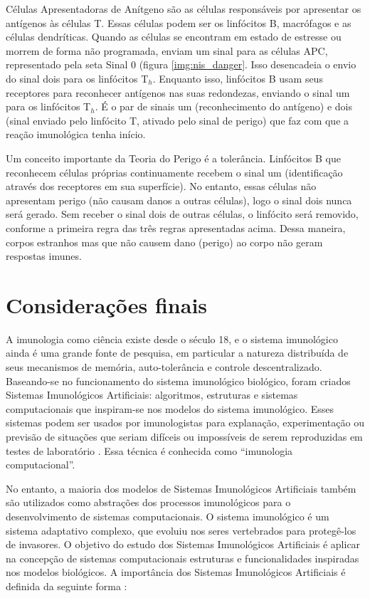 Células Apresentadoras de Anítgeno são as células responsáveis por apresentar os antígenos às células T. Essas células podem ser os linfócitos B, macrófagos e as células dendríticas. Quando as células se encontram em estado de estresse ou morrem de forma não programada, enviam um sinal para as células APC, representado pela seta Sinal 0 (figura \ref{img:nis_danger}. Isso desencadeia o envio do sinal dois para os linfócitos T$_{h}$. Enquanto isso, linfócitos B usam seus receptores para reconhecer antígenos nas suas redondezas, enviando o sinal um para os linfócitos T$_{h}$. É o par de sinais um (reconhecimento do antígeno) e dois (sinal enviado pelo linfócito T, ativado pelo sinal de perigo) que faz com que a reação imunológica tenha início.

Um conceito importante da Teoria do Perigo é a tolerância. Linfócitos B que reconhecem células próprias continuamente recebem o sinal um (identificação através dos receptores em sua superfície). No entanto, essas células não apresentam perigo (não causam danos a outras células), logo o sinal dois nunca será gerado. Sem receber o sinal dois de outras células, o linfócito será removido, conforme a primeira regra das três regras apresentadas acima. Dessa maneira, corpos estranhos mas que não causem dano (perigo) ao corpo não geram respostas imunes.

\section{Considerações finais}

A imunologia como ciência existe desde o século 18, e o sistema imunológico ainda é uma grande fonte de pesquisa, em particular a natureza distribuída de seus mecanismos de memória, auto-tolerância e controle descentralizado. Baseando-se no funcionamento do sistema imunológico biológico, foram criados Sistemas Imunológicos Artificiais: algoritmos, estruturas e sistemas computacionais que inspiram-se nos modelos do sistema imunológico. Esses sistemas podem ser usados por imunologistas para explanação, experimentação ou previsão de situações que seriam difíceis ou impossíveis de serem reproduzidas em testes de laboratório \cite{Garrett2005}. Essa técnica é conhecida como ``imunologia computacional''.

No entanto, a maioria dos modelos de Sistemas Imunológicos Artificiais também são utilizados como abstrações dos processos imunológicos para o desenvolvimento de sistemas computacionais. O sistema imunológico é um sistema adaptativo complexo, que evoluiu nos seres vertebrados para protegê-los de invasores. O objetivo do estudo dos Sistemas Imunológicos Artificiais é aplicar na concepção de sistemas computacionais estruturas e funcionalidades inspiradas nos modelos biológicos. A importância dos Sistemas Imunológicos Artificiais é definida da seguinte forma \cite{Dasgupta2006}:

